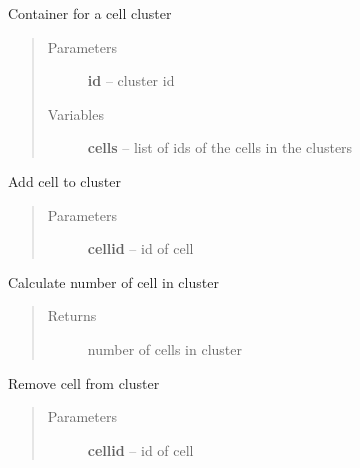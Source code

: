 \documentclass[letterpaper,10pt,english]{sphinxmanual}
\begin{document}
\begin{fulllineitems}
\label{AnalysisUtils:AnalysisUtils.Cluster}
Container for a cell cluster
\begin{quote}\begin{description}
\item[{Parameters}] \leavevmode
\textbf{id} -- cluster id

\item[{Variables}] \leavevmode
\textbf{cells} -- list of ids of the cells in the clusters

\end{description}\end{quote}

\begin{fulllineitems}
\label{AnalysisUtils:AnalysisUtils.Cluster.addCell}
Add cell to cluster
\begin{quote}\begin{description}
\item[{Parameters}] \leavevmode
\textbf{cellid} -- id of cell

\end{description}\end{quote}

\end{fulllineitems}


\begin{fulllineitems}
\label{AnalysisUtils:AnalysisUtils.Cluster.getClusterSize}
Calculate number of cell in cluster
\begin{quote}\begin{description}
\item[{Returns}] \leavevmode
number of cells in cluster

\end{description}\end{quote}

\end{fulllineitems}


\begin{fulllineitems}
\label{AnalysisUtils:AnalysisUtils.Cluster.removeCell}
Remove cell from cluster
\begin{quote}\begin{description}
\item[{Parameters}] \leavevmode
\textbf{cellid} -- id of cell

\end{description}\end{quote}

\end{fulllineitems}


\end{fulllineitems}
\end{document}
